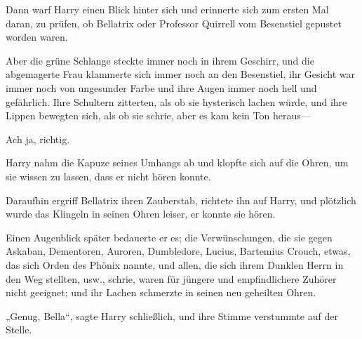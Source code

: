 Dann warf Harry einen Blick hinter sich und erinnerte sich zum ersten Mal daran, zu prüfen, ob Bellatrix oder Professor Quirrell vom Besenstiel gepustet worden waren.

Aber die grüne Schlange steckte immer noch in ihrem Geschirr, und die abgemagerte Frau klammerte sich immer noch an den Besenstiel, ihr Gesicht war immer noch von ungesunder Farbe und ihre Augen immer noch hell und gefährlich. Ihre Schultern zitterten, als ob sie hysterisch lachen würde, und ihre Lippen bewegten sich, als ob sie schrie, aber es kam kein Ton heraus—

Ach ja, richtig.

Harry nahm die Kapuze seines Umhangs ab und klopfte sich auf die Ohren, um sie wissen zu lassen, dass er nicht hören konnte.

Daraufhin ergriff Bellatrix ihren Zauberstab, richtete ihn auf Harry, und plötzlich wurde das Klingeln in seinen Ohren leiser, er konnte sie hören.

Einen Augenblick später bedauerte er es; die Verwünschungen, die sie gegen Askaban, Dementoren, Auroren, Dumbledore, Lucius, Bartemius Crouch, etwas, das sich Orden des Phönix nannte, und allen, die sich ihrem Dunklen Herrn in den Weg stellten, usw., schrie, waren für jüngere und empfindlichere Zuhörer nicht geeignet; und ihr Lachen schmerzte in seinen neu geheilten Ohren.

„Genug, Bella“, sagte Harry schließlich, und ihre Stimme verstummte auf der Stelle.

